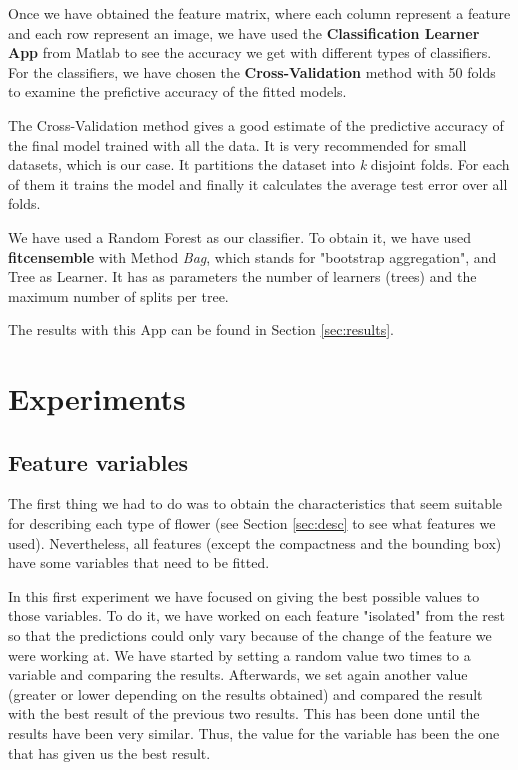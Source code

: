 \documentclass[11]{article}
\begin{document}
Once we have obtained the feature matrix, where each column represent a feature and each row represent an image, we have used the \textbf{Classification Learner App} from Matlab to see the accuracy we get with different types of classifiers. For the classifiers, we have chosen the \textbf{Cross-Validation} method with 50 folds to examine the prefictive accuracy of the fitted models.

The Cross-Validation method gives a good estimate of the predictive accuracy of the final model trained with all the data. It is very recommended for small datasets, which is our case. It partitions the dataset into \textit{k} disjoint folds. For each of them it trains the model and finally it calculates the average test error over all folds.

We have used a Random Forest as our classifier. To obtain it, we have used \textbf{fitcensemble} with Method \textit{Bag}, which stands for "bootstrap aggregation", and Tree as Learner. It has as parameters the number of learners (trees) and the maximum number of splits per tree.

The results with this App can be found in Section \ref{sec:results}.

\section{Experiments}

\subsection{Feature variables}

The first thing we had to do was to obtain the characteristics that seem suitable for describing each type of flower (see Section \ref{sec:desc} to see what features we used). Nevertheless, all features (except the compactness and the bounding box) have some variables that need to be fitted.

In this first experiment we have focused on giving the best possible values to those variables. To do it, we have worked on each feature "isolated" from the rest so that the predictions could only vary because of the change of the feature we were working at. We have started by setting a random value two times to a variable and comparing the results. Afterwards, we set again another value (greater or lower depending on the results obtained) and compared the result with the best result of the previous two results. This has been done until the results have been very similar. Thus, the value for the variable has been the one that has given us the best result.
\end{document}
